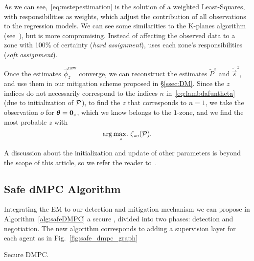 \documentclass{ifacconf}  %
\begin{document}
As we can see,~\eqref{eq:mstepestimation} is the solution of a weighted Least-Squares, with responsibilities as weights, which adjust the contribution of all observations to the regression models.
We can see some similarities to the K-planes algorithm (see~\cite{BradleyMangasarian2000}), but \EM{} is more compromising.
Instead of affecting the observed data to a zone with 100\% of certainty (\emph{hard assignment}), \EM{} uses each zone's responsibilities (\emph{soft assignment}).

Once the estimates $\vec{\phi}_{z}^{\mathrm{new}}$ converge, we can reconstruct the estimates $\tilde{P}^{z}$ and $\tilde{\vec{s}}^{z}$, and use them in our mitigation scheme proposed in \S\ref{ssec:DM}.
Since the $z$ indices do not necessarily correspond to the indices $n$ in~\eqref{eq:lambdafuntheta} (due to initialization of $\mathcal{P}$),
to find the $z$ that corresponds to ${n=1}$, we take the observation $o$ for $\relax{\boldsymbol{\theta}}=\mathbf{0}_{c}$, which we know belongs to the $1$-zone, and we find the most probable $z$ with
\begin{equation*}\label{eq:argmaxz}
\arg\underset{z}{\max\!.}\ {\zeta_{zo}(\mathcal{P})}.
\end{equation*}

\begin{remark}
A discussion about the initialization and update of other parameters is beyond the scope of this article, so we refer the reader to~\cite{Bishop2006}.
\end{remark}

\subsection{Safe dMPC Algorithm}\label{ssec:safe_algo}
Integrating the EM to our detection and mitigation mechanism we can propose in Algorithm~\ref{alg:safeDMPC} a secure \dmpc{}, divided into two phases: detection and negotiation.
The new algorithm corresponds to adding a supervision layer for each agent as in Fig.~\ref{fig:safe_dmpc_graph}
\begin{algorithm2e}[h]
  \DontPrintSemicolon
 \caption{Secure DMPC.}\label{alg:safeDMPC}
\end{algorithm2e}
\end{document}

